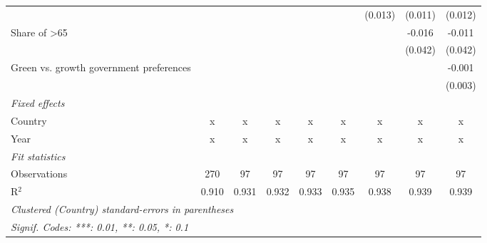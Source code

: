 \begin{table}[htbp]
\begin{tabular}{lcccccccc}
                                                  &         &         &         &         &         & (0.013) & (0.011)      & (0.012)\\   
      Share of >65                                &         &         &         &         &         &         & -0.016       & -0.011\\   
                                                  &         &         &         &         &         &         & (0.042)      & (0.042)\\   
      Green vs. growth government preferences     &         &         &         &         &         &         &              & -0.001\\   
                                                  &         &         &         &         &         &         &              & (0.003)\\   
      \emph{Fixed effects}\\
      Country                                     & x       & x       & x       & x       & x       & x       & x            & x\\  
      Year                                        & x       & x       & x       & x       & x       & x       & x            & x\\  
      \midrule \emph{Fit statistics}\\
      Observations                                & 270     & 97      & 97      & 97      & 97      & 97      & 97           & 97\\  
      R$^2$                                       & 0.910   & 0.931   & 0.932   & 0.933   & 0.935   & 0.938   & 0.939        & 0.939\\  
      \midrule
      \multicolumn{9}{l}{\emph{Clustered (Country) standard-errors in parentheses}}\\
      \multicolumn{9}{l}{\emph{Signif. Codes: ***: 0.01, **: 0.05, *: 0.1}}\\
   \end{tabular}
\end{table}


